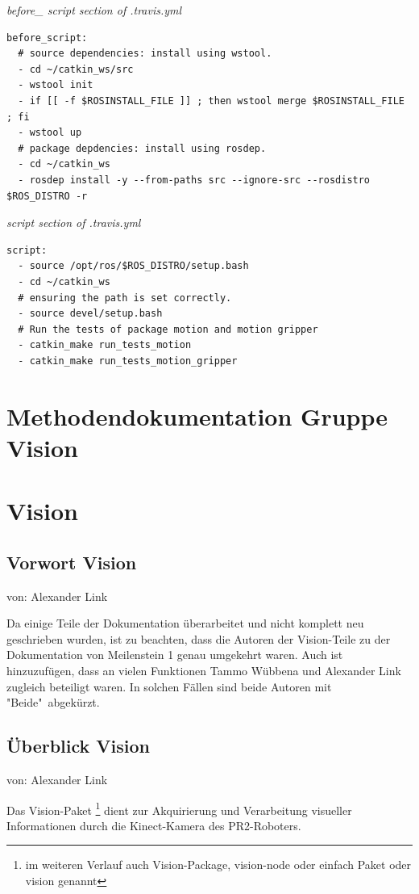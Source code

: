 \documentclass{suturo}
\makeatletter
\newcommand{\chapterauthor}[1]{%
  {\parindent0pt\vspace*{-27pt}%
  \linespread{0}\small\begin{flushright}von: #1\end{flushright}%
  \par\nobreak\vspace*{0pt}}
  \@afterheading%
}
\makeatother
\begin{document}
\textit{before\_ script section of .travis.yml}

\begin{verbatim}
before_script:
  # source dependencies: install using wstool.
  - cd ~/catkin_ws/src
  - wstool init
  - if [[ -f $ROSINSTALL_FILE ]] ; then wstool merge $ROSINSTALL_FILE ; fi
  - wstool up
  # package depdencies: install using rosdep.
  - cd ~/catkin_ws
  - rosdep install -y --from-paths src --ignore-src --rosdistro $ROS_DISTRO -r

\end{verbatim}

\textit{script section of .travis.yml}

\begin{verbatim}
script:
  - source /opt/ros/$ROS_DISTRO/setup.bash
  - cd ~/catkin_ws
  # ensuring the path is set correctly.
  - source devel/setup.bash
  # Run the tests of package motion and motion gripper
  - catkin_make run_tests_motion
  - catkin_make run_tests_motion_gripper
\end{verbatim}

\newpage

\section*{Methodendokumentation Gruppe Vision}

\section{Vision}
\subsection{Vorwort Vision}
\chapterauthor{Alexander Link}
Da einige Teile der Dokumentation überarbeitet und nicht komplett neu geschrieben wurden, ist zu beachten, dass die Autoren der Vision-Teile zu der Dokumentation von Meilenstein 1 genau umgekehrt waren. Auch ist hinzuzufügen, dass an vielen Funktionen Tammo Wübbena und Alexander Link zugleich beteiligt waren. In solchen Fällen sind beide Autoren mit "Beide"\ abgekürzt.

\subsection{Überblick Vision}
\chapterauthor{Alexander Link}
Das Vision-Paket \footnote{im weiteren Verlauf auch Vision-Package, vision-node oder einfach Paket oder vision genannt} dient zur Akquirierung und Verarbeitung visueller Informationen durch die Kinect-Kamera des PR2-Roboters.
\end{document}
